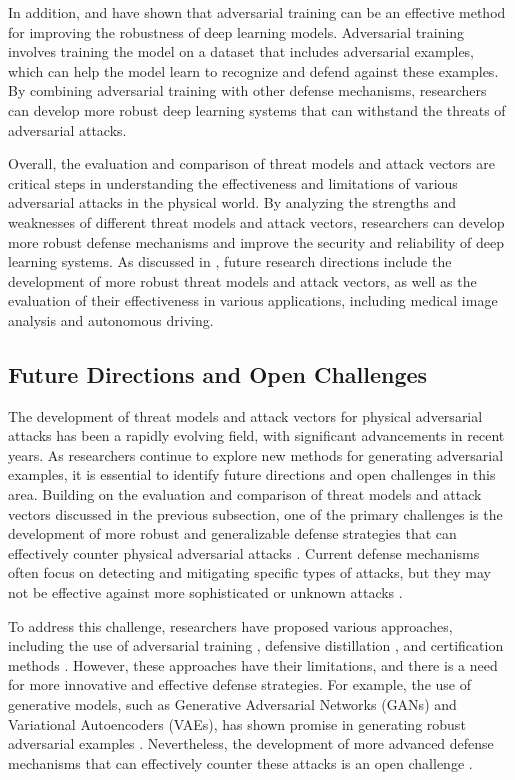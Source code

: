\documentclass[11pt,a4paper]{article}
\begin{document}
In addition, \cite{arxiv:1803.00404} and \cite{doi:10.1016/j.eng.2019.12.012} have shown that adversarial training can be an effective method for improving the robustness of deep learning models. Adversarial training involves training the model on a dataset that includes adversarial examples, which can help the model learn to recognize and defend against these examples. By combining adversarial training with other defense mechanisms, researchers can develop more robust deep learning systems that can withstand the threats of adversarial attacks.

Overall, the evaluation and comparison of threat models and attack vectors are critical steps in understanding the effectiveness and limitations of various adversarial attacks in the physical world. By analyzing the strengths and weaknesses of different threat models and attack vectors, researchers can develop more robust defense mechanisms and improve the security and reliability of deep learning systems. As discussed in \cite{doi:10.1007/s11263-023-01934-3}, future research directions include the development of more robust threat models and attack vectors, as well as the evaluation of their effectiveness in various applications, including medical image analysis and autonomous driving.


\subsection{Future Directions and Open Challenges}


The development of threat models and attack vectors for physical adversarial attacks has been a rapidly evolving field, with significant advancements in recent years. As researchers continue to explore new methods for generating adversarial examples, it is essential to identify future directions and open challenges in this area. Building on the evaluation and comparison of threat models and attack vectors discussed in the previous subsection, one of the primary challenges is the development of more robust and generalizable defense strategies that can effectively counter physical adversarial attacks \cite{doi:10.1109/access.2023.3345000}. Current defense mechanisms often focus on detecting and mitigating specific types of attacks, but they may not be effective against more sophisticated or unknown attacks \cite{doi:10.24963/ijcai.2021/694}.

To address this challenge, researchers have proposed various approaches, including the use of adversarial training \cite{arxiv:2210.07540}, defensive distillation \cite{doi:10.1109/cvprw56347.2022.00034}, and certification methods \cite{arxiv:1707.08945}. However, these approaches have their limitations, and there is a need for more innovative and effective defense strategies. For example, the use of generative models, such as Generative Adversarial Networks (GANs) and Variational Autoencoders (VAEs), has shown promise in generating robust adversarial examples \cite{doi:10.1109/cvpr.2019.00935}. Nevertheless, the development of more advanced defense mechanisms that can effectively counter these attacks is an open challenge \cite{doi:10.58496/adsa/2024/011}.
\end{document}

